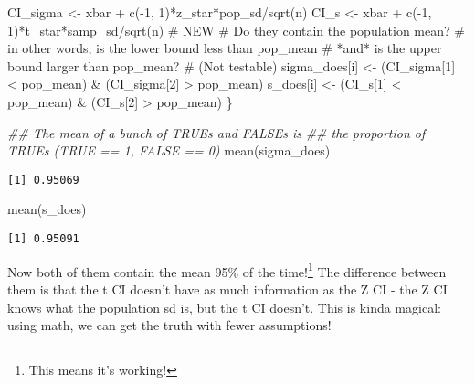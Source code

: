 \documentclass[
  letterpaper,
  DIV=11,
  numbers=noendperiod]{scrreprt}
\newenvironment{Shaded}{\begin{snugshade}}{\end{snugshade}}
\newcommand{\CommentTok}[1]{\textcolor[rgb]{0.37,0.37,0.37}{#1}}
\newcommand{\DecValTok}[1]{\textcolor[rgb]{0.68,0.00,0.00}{#1}}
\newcommand{\DocumentationTok}[1]{\textcolor[rgb]{0.37,0.37,0.37}{\textit{#1}}}
\newcommand{\FunctionTok}[1]{\textcolor[rgb]{0.28,0.35,0.67}{#1}}
\newcommand{\NormalTok}[1]{\textcolor[rgb]{0.00,0.23,0.31}{#1}}
\newcommand{\OtherTok}[1]{\textcolor[rgb]{0.00,0.23,0.31}{#1}}
\newcommand{\SpecialCharTok}[1]{\textcolor[rgb]{0.37,0.37,0.37}{#1}}
\begin{document}
\begin{Shaded}
\begin{Highlighting}[]
\NormalTok{    CI\_sigma }\OtherTok{\textless{}{-}}\NormalTok{ xbar }\SpecialCharTok{+} \FunctionTok{c}\NormalTok{(}\SpecialCharTok{{-}}\DecValTok{1}\NormalTok{, }\DecValTok{1}\NormalTok{)}\SpecialCharTok{*}\NormalTok{z\_star}\SpecialCharTok{*}\NormalTok{pop\_sd}\SpecialCharTok{/}\FunctionTok{sqrt}\NormalTok{(n)}
\NormalTok{    CI\_s }\OtherTok{\textless{}{-}}\NormalTok{ xbar }\SpecialCharTok{+} \FunctionTok{c}\NormalTok{(}\SpecialCharTok{{-}}\DecValTok{1}\NormalTok{, }\DecValTok{1}\NormalTok{)}\SpecialCharTok{*}\NormalTok{t\_star}\SpecialCharTok{*}\NormalTok{samp\_sd}\SpecialCharTok{/}\FunctionTok{sqrt}\NormalTok{(n) }\CommentTok{\# NEW}
    \CommentTok{\# Do they contain the population mean?}
    \CommentTok{\# in other words, is the lower bound less than pop\_mean}
    \CommentTok{\# *and* is the upper bound larger than pop\_mean?}
    \CommentTok{\# (Not testable)}
\NormalTok{    sigma\_does[i] }\OtherTok{\textless{}{-}}\NormalTok{ (CI\_sigma[}\DecValTok{1}\NormalTok{] }\SpecialCharTok{\textless{}}\NormalTok{ pop\_mean) }\SpecialCharTok{\&}\NormalTok{ (CI\_sigma[}\DecValTok{2}\NormalTok{] }\SpecialCharTok{\textgreater{}}\NormalTok{ pop\_mean)}
\NormalTok{    s\_does[i] }\OtherTok{\textless{}{-}}\NormalTok{ (CI\_s[}\DecValTok{1}\NormalTok{] }\SpecialCharTok{\textless{}}\NormalTok{ pop\_mean) }\SpecialCharTok{\&}\NormalTok{ (CI\_s[}\DecValTok{2}\NormalTok{] }\SpecialCharTok{\textgreater{}}\NormalTok{ pop\_mean)}
\NormalTok{\}}

\DocumentationTok{\#\# The mean of a bunch of TRUEs and FALSEs is}
\DocumentationTok{\#\# the proportion of TRUEs (TRUE == 1, FALSE == 0)}
\FunctionTok{mean}\NormalTok{(sigma\_does)}
\end{Highlighting}
\end{Shaded}

\begin{verbatim}
[1] 0.95069
\end{verbatim}

\begin{Shaded}
\begin{Highlighting}[]
\FunctionTok{mean}\NormalTok{(s\_does)}
\end{Highlighting}
\end{Shaded}

\begin{verbatim}
[1] 0.95091
\end{verbatim}

Now both of them contain the mean 95\% of the time!\footnote{This means
  it's working!} The difference between them is that the t CI doesn't
have as much information as the Z CI - the Z CI knows what the
population sd is, but the t CI doesn't. This is kinda magical: using
math, we can get the truth with fewer assumptions!
\end{document}
